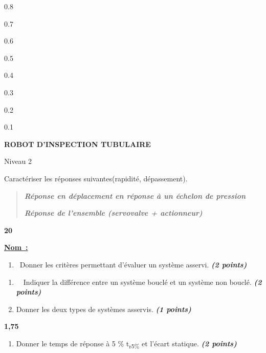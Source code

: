 0.8

0.7

0.6

0.5

0.4

0.3

0.2

0.1

\textbf{ROBOT D'INSPECTION TUBULAIRE}

Niveau 2

Caractériser les réponses suivantes(rapidité, dépassement).


\begin{quote}
\emph{\textbf{Réponse en déplacement en réponse à un échelon de
pression}}


\emph{\textbf{Réponse de l'ensemble (servovalve + actionneur)}}
\end{quote}

\textbf{20}

\textbf{\ul{Nom~:}}

\begin{enumerate}
\def\labelenumi{\arabic{enumi}.}
\item
  ~Donner les critères permettant d'évaluer un système asservi.
  \emph{\textbf{(2 points)}}
\end{enumerate}

\begin{enumerate}
\def\labelenumi{\arabic{enumi}.}
\item
  ~~Indiquer la différence entre un système bouclé et un système non
  bouclé. \emph{\textbf{(2 points)}}
\item
  Donner les deux types de systèmes asservis. \emph{\textbf{(1 points)}}
\end{enumerate}


\textbf{1,75}

\begin{enumerate}
\def\labelenumi{\arabic{enumi}.}
\setcounter{enumi}{1}
\item
  Donner le temps de réponse à 5 \% t\textsubscript{r5\%} et l'écart
  statique. \emph{\textbf{(2 points)}}
\end{enumerate}


